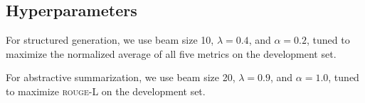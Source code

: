 \documentclass[11pt,a4paper]{article}
\newcommand{\rouge}{\textsc{rouge}\xspace}
\begin{document}
\subsection{Hyperparameters}
\label{sec:appendix_hyperparameters}
For structured generation, we use beam size 10, $\lambda = 0.4$, and  $\alpha = 0.2$, tuned to maximize the normalized average of all five metrics on the development set.

For abstractive summarization, we use beam size 20, $\lambda = 0.9$, and  $\alpha = 1.0$, tuned to maximize \rouge-L on the development set.

 
\end{document}
